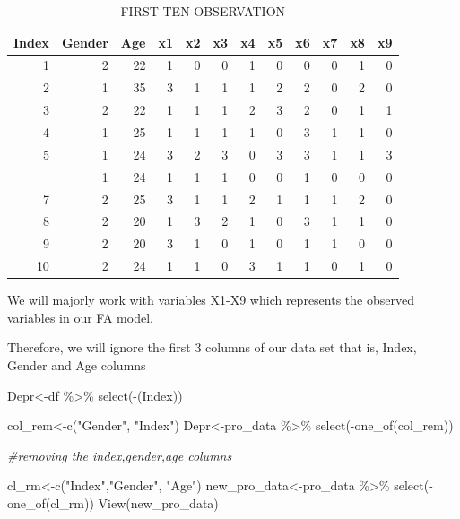 \documentclass[
]{article}
\newenvironment{Shaded}{\begin{snugshade}}{\end{snugshade}}
\newcommand{\CommentTok}[1]{\textcolor[rgb]{0.56,0.35,0.01}{\textit{#1}}}
\newcommand{\FunctionTok}[1]{\textcolor[rgb]{0.00,0.00,0.00}{#1}}
\newcommand{\NormalTok}[1]{#1}
\newcommand{\OtherTok}[1]{\textcolor[rgb]{0.56,0.35,0.01}{#1}}
\newcommand{\SpecialCharTok}[1]{\textcolor[rgb]{0.00,0.00,0.00}{#1}}
\newcommand{\StringTok}[1]{\textcolor[rgb]{0.31,0.60,0.02}{#1}}
\begin{document}
\begin{longtable}[t]{rrrrrrrrrrrr}
\caption{\label{tab:unnamed-chunk-1}FIRST TEN OBSERVATION}\\
\toprule
Index & Gender & Age & x1 & x2 & x3 & x4 & x5 & x6 & x7 & x8 & x9\\
\midrule
1 & 2 & 22 & 1 & 0 & 0 & 1 & 0 & 0 & 0 & 1 & 0\\
2 & 1 & 35 & 3 & 1 & 1 & 1 & 2 & 2 & 0 & 2 & 0\\
3 & 2 & 22 & 1 & 1 & 1 & 2 & 3 & 2 & 0 & 1 & 1\\
4 & 1 & 25 & 1 & 1 & 1 & 1 & 0 & 3 & 1 & 1 & 0\\
5 & 1 & 24 & 3 & 2 & 3 & 0 & 3 & 3 & 1 & 1 & 3\\
\addlinespace
6 & 1 & 24 & 1 & 1 & 1 & 0 & 0 & 1 & 0 & 0 & 0\\
7 & 2 & 25 & 3 & 1 & 1 & 2 & 1 & 1 & 1 & 2 & 0\\
8 & 2 & 20 & 1 & 3 & 2 & 1 & 0 & 3 & 1 & 1 & 0\\
9 & 2 & 20 & 3 & 1 & 0 & 1 & 0 & 1 & 1 & 0 & 0\\
10 & 2 & 24 & 1 & 1 & 0 & 3 & 1 & 1 & 0 & 1 & 0\\
\bottomrule
\end{longtable}

We will majorly work with variables X1-X9 which represents the observed
variables in our FA model.

Therefore, we will ignore the first 3 columns of our data set that is,
Index, Gender and Age columns

\begin{Shaded}
\begin{Highlighting}[]
\NormalTok{Depr}\OtherTok{\textless{}{-}}\NormalTok{df }\SpecialCharTok{\%\textgreater{}\%} 
  \FunctionTok{select}\NormalTok{(}\SpecialCharTok{{-}}\NormalTok{(Index))}

\NormalTok{col\_rem}\OtherTok{\textless{}{-}}\FunctionTok{c}\NormalTok{(}\StringTok{"Gender"}\NormalTok{, }\StringTok{"Index"}\NormalTok{)}
\NormalTok{Depr}\OtherTok{\textless{}{-}}\NormalTok{pro\_data }\SpecialCharTok{\%\textgreater{}\%} 
  \FunctionTok{select}\NormalTok{(}\SpecialCharTok{{-}}\FunctionTok{one\_of}\NormalTok{(col\_rem))}

\CommentTok{\#removing the index,gender,age columns}

\NormalTok{cl\_rm}\OtherTok{\textless{}{-}}\FunctionTok{c}\NormalTok{(}\StringTok{"Index"}\NormalTok{,}\StringTok{"Gender"}\NormalTok{, }\StringTok{"Age"}\NormalTok{)}
\NormalTok{new\_pro\_data}\OtherTok{\textless{}{-}}\NormalTok{pro\_data }\SpecialCharTok{\%\textgreater{}\%} 
  \FunctionTok{select}\NormalTok{(}\SpecialCharTok{{-}}\FunctionTok{one\_of}\NormalTok{(cl\_rm))}
\FunctionTok{View}\NormalTok{(new\_pro\_data)}
\end{Highlighting}
\end{Shaded}
\end{document}
